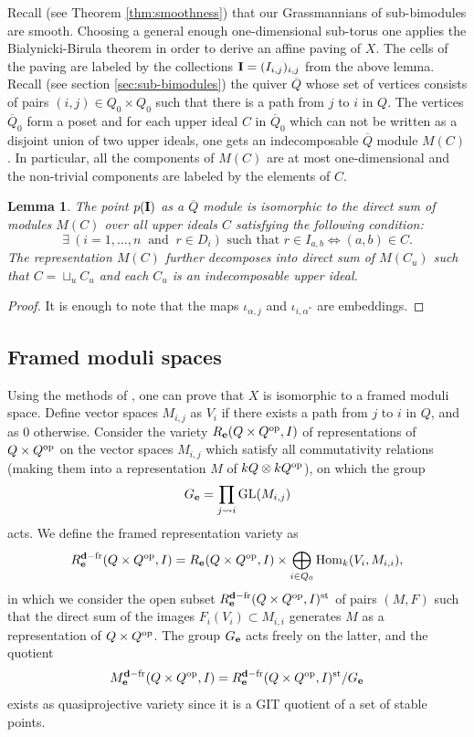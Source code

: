 \documentclass[12pt,a4paper]{amsart}
\numberwithin{equation}{section}
\newtheorem{lem}[thm]{Lemma}
\theoremstyle{remark}
\begin{document}
Recall (see Theorem \ref{thm:smoothness}) that our Grassmannians of sub-bimodules are smooth. 
Choosing a general enough one-dimensional sub-torus  one applies the Bialynicki-Birula
theorem \cite{B-B73,B-B74}  in order to derive an affine paving of $X$. The cells
of the paving are labeled by the collections ${\bf I}=(I_{i,j})_{i,j}$ 
from the above lemma. 
Recall (see section \ref{sec:sub-bimodules}) the quiver $\overline Q$ whose set of vertices consists 
of pairs $(i,j)\in Q_0\times Q_0$  such that there is a path from $j$ to $i$ in $Q$. 
The vertices $\overline Q_0$ form a poset and for each upper ideal $C$ in $\overline Q_0$
which can not be written as a disjoint union of two upper ideals, one gets an indecomposable
$\overline Q$ module $M(C)$. In particular, all the components of $M(C)$ are at most
one-dimensional and the non-trivial components are labeled by the elements of $C$.

\begin{lem}
The point $p({\bf I})$ as a $\overline Q$ module is isomorphic to the direct sum of
modules $M(C)$ over all upper ideals $C$ satisfying the following condition:
\[
\exists\ (i=1,\dots,n \ \text{ and }\ r\in D_i) \text{ such that } 
r\in I_{a,b} \Leftrightarrow (a,b)\in C.
\]
The representation $M(C)$ further decomposes into direct sum of $M(C_u)$ such that 
$C=\sqcup_u C_u$ and each $C_u$ is an indecomposable upper ideal.
\end{lem}
\begin{proof}
It is enough to note that the maps  $\iota_{\alpha,j}$ and $\iota_{i,\alpha^*}$ are 
embeddings.
\end{proof}

\subsection{Framed moduli spaces}

Using the methods of \cite{R08}, one can prove that $X$ is isomorphic to a framed moduli space.
Define vector spaces $M_{i,j}$ as $V_i$ if there exists a path from $j$ to $i$ in $Q$, and as
$0$ otherwise. Consider the variety $R_{\bf e}(Q\times Q^{\rm op},I)$ of representations of
$Q\times Q^{\rm op}$ on the vector spaces $M_{i,j}$ which satisfy all commutativity relations (making them into a representation $M$ of $kQ\otimes kQ^{\rm op}$), on which the group 
$$G_{\bf e}=\prod_{j\leadsto i}{\rm GL}(M_{i,j})$$ 
acts. We define the framed representation variety as 
$$R_{\bf e}^{{\bf d}-{\rm fr}}(Q\times Q^{\rm op},I)=R_{\bf e}(Q\times Q^{\rm op},I)\times\bigoplus_{i\in Q_0}{\rm Hom}_k(V_i,M_{i,i}),$$
in which we consider the open subset 
$R_{\bf e}^{{\bf d}-{\rm fr}}(Q\times Q^{\rm op},I)^{\rm st}$ of pairs $(M,F)$ 
such that the direct sum of the images $F_i(V_i)\subset M_{i,i}$ generates $M$ as a
representation of $Q\times Q^{\rm op}$. The group $G_{\bf e}$ acts freely on the latter, 
and the quotient
$$M_{\bf e}^{{\bf d}-{\rm fr}}(Q\times Q^{\rm op},I)=R_{\bf e}^{{\bf d}-{\rm fr}}(Q\times Q^{\rm op},I)^{\rm st}/G_{\bf e}$$
exists as quasiprojective variety since it is a GIT quotient of a set of stable points.  
\end{document}
